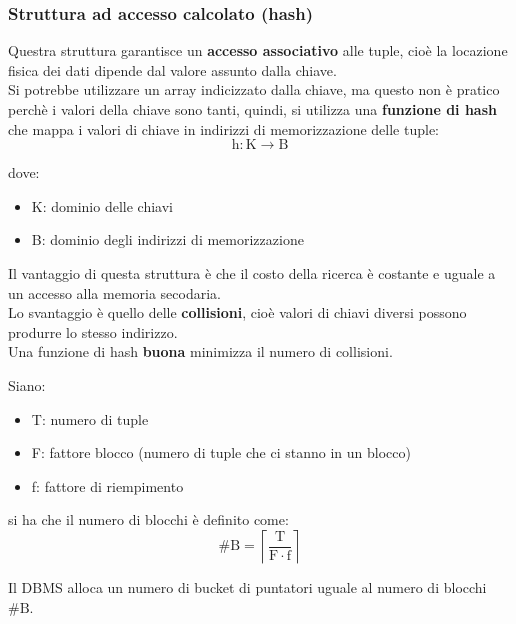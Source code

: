 \subsubsection{Struttura ad accesso calcolato (hash)}
Questra struttura garantisce un \textbf{accesso associativo} alle tuple, cioè la locazione fisica dei dati dipende dal valore assunto dalla chiave.\\[0.2ex]
Si potrebbe utilizzare un array indicizzato dalla chiave, ma questo non è pratico perchè i valori della chiave sono tanti, quindi, si utilizza una \textbf{funzione di hash} che mappa i valori di chiave in indirizzi di memorizzazione delle tuple:
\begin{equation*}
  \mathrm{h : K \rightarrow B}
\end{equation*}

dove:
\begin{itemize}[label=$\triangleright$, itemsep=\smallskipamount]
  \item K: dominio delle chiavi
  \item B: dominio degli indirizzi di memorizzazione
\end{itemize}

Il vantaggio di questa struttura è che il costo della ricerca è costante e uguale a un accesso alla memoria secodaria.\\[0.2ex]
Lo svantaggio è quello delle \textbf{collisioni}, cioè valori di chiavi diversi possono produrre lo stesso indirizzo.\\[0.2ex]
Una funzione di hash \textbf{buona} minimizza il numero di collisioni.


Siano:
\begin{itemize}[label=$\triangleright$, itemsep=\smallskipamount]
  \item T: numero di tuple
  \item F: fattore blocco (numero di tuple che ci stanno in un blocco)
  \item f: fattore di riempimento
\end{itemize}

si ha che il numero di blocchi è definito come:
\begin{equation*}
  \boldsymbol{\mathrm{\# B = \left\lceil \frac{T}{F \cdot f} \right\rceil}}
\end{equation*}

Il DBMS alloca un numero di bucket di puntatori uguale al numero di blocchi $\mathrm{\# B}$.

